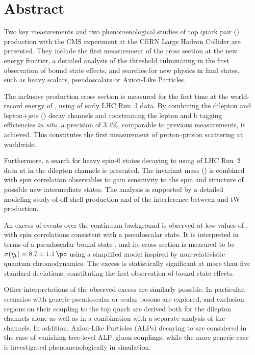 \cleardoublepage %
\chapter*{Abstract}

Two key measurements and two phenomenological studies of top quark pair (\ttbar) production with the CMS experiment at the CERN Large Hadron Collider are presented. They include the first measurement of the \ttbar cross section at the new energy frontier, a detailed analysis of the \ttbar threshold culminating in the first observation of \ttbar bound state effects, and searches for new physics in \ttbar final states, such as heavy scalars, pseudoscalars or Axion-Like Particles.

The inclusive \ttbar production cross section \sigmatt is measured for the first time at the world-record energy of \sqrtsRIII, using \lumiRIII of early LHC Run~3 data. By combining the dilepton and lepton+jets (\ljets) decay channels and constraining the lepton and b tagging efficiencies \textit{in situ}, a precision of $3.4\%$, comparable to previous \sigmatt measurements, is achieved. This constitutes the first measurement of proton--proton scattering at \sqrtsRIII worldwide.

Furthermore, a search for heavy spin-0 states decaying to \ttbar using \lumiRII of LHC Run~2 data at \sqrtsRII in the dilepton channels is presented. The invariant \ttbar mass (\mtt) is combined with spin correlation observables to gain sensitivity to the spin and \CP structure of possible new intermediate states. 
The analysis is supported by a detailed modeling study of off-shell \ttbar production and of the interference between \ttbar and tW production.

An excess of events over the \ttbar continuum background is observed at low values of \mtt, with spin correlations consistent with a pseudoscalar state. It is interpreted in terms of a pseudoscalar \ttbar bound state \etat, and its cross section is measured to be $\sigetat =  8.7 \pm 1.1  \, \si{\pb}$ using a simplified model inspired by non-relativistic quantum chromodynamics. 
The excess is statistically significant at more than five standard deviations, constituting the first observation of \ttbar bound state effects.

Other interpretations of the observed excess are similarly possible. In particular, scenarios with generic pseudoscalar or scalar bosons are explored, and exclusion regions on their coupling to the top quark are derived both for the dilepton channels alone as well as in a combination with a separate analysis of the \ljets channels. In addition, Axion-Like Particles (ALPs) decaying to \ttbar are considered in the case of vanishing tree-level ALP--gluon couplings, while the more generic case is investigated phenomenologically in simulation.

